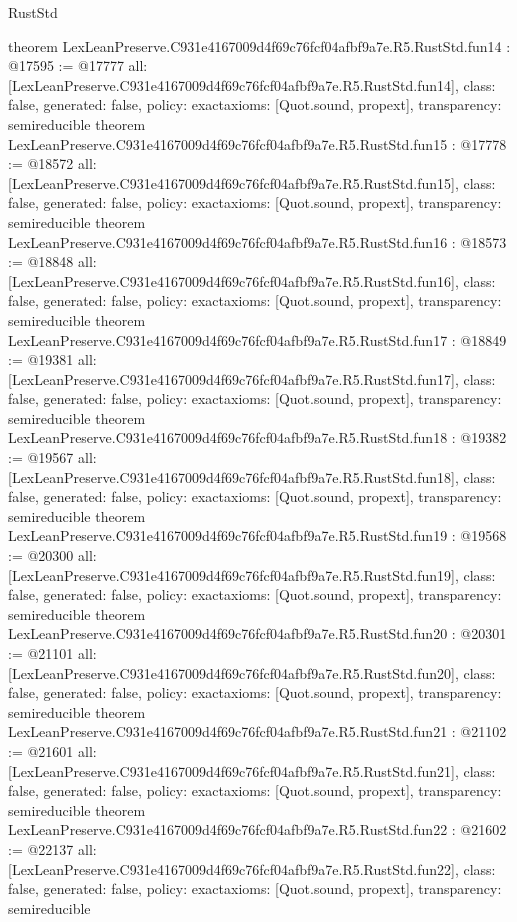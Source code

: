 \begin{lexlean}{RustStd}
\begin{coremodule}
{}
theorem LexLeanPreserve.C931e4167009d4f69c76fcf04afbf9a7e.R5.RustStd.fun14 : @17595 := @17777 {
  all: [LexLeanPreserve.C931e4167009d4f69c76fcf04afbf9a7e.R5.RustStd.fun14],
  class: false,
  generated: false,
  policy: exact{axioms: [Quot.sound, propext]},
  transparency: semireducible
}
theorem LexLeanPreserve.C931e4167009d4f69c76fcf04afbf9a7e.R5.RustStd.fun15 : @17778 := @18572 {
  all: [LexLeanPreserve.C931e4167009d4f69c76fcf04afbf9a7e.R5.RustStd.fun15],
  class: false,
  generated: false,
  policy: exact{axioms: [Quot.sound, propext]},
  transparency: semireducible
}
theorem LexLeanPreserve.C931e4167009d4f69c76fcf04afbf9a7e.R5.RustStd.fun16 : @18573 := @18848 {
  all: [LexLeanPreserve.C931e4167009d4f69c76fcf04afbf9a7e.R5.RustStd.fun16],
  class: false,
  generated: false,
  policy: exact{axioms: [Quot.sound, propext]},
  transparency: semireducible
}
theorem LexLeanPreserve.C931e4167009d4f69c76fcf04afbf9a7e.R5.RustStd.fun17 : @18849 := @19381 {
  all: [LexLeanPreserve.C931e4167009d4f69c76fcf04afbf9a7e.R5.RustStd.fun17],
  class: false,
  generated: false,
  policy: exact{axioms: [Quot.sound, propext]},
  transparency: semireducible
}
theorem LexLeanPreserve.C931e4167009d4f69c76fcf04afbf9a7e.R5.RustStd.fun18 : @19382 := @19567 {
  all: [LexLeanPreserve.C931e4167009d4f69c76fcf04afbf9a7e.R5.RustStd.fun18],
  class: false,
  generated: false,
  policy: exact{axioms: [Quot.sound, propext]},
  transparency: semireducible
}
theorem LexLeanPreserve.C931e4167009d4f69c76fcf04afbf9a7e.R5.RustStd.fun19 : @19568 := @20300 {
  all: [LexLeanPreserve.C931e4167009d4f69c76fcf04afbf9a7e.R5.RustStd.fun19],
  class: false,
  generated: false,
  policy: exact{axioms: [Quot.sound, propext]},
  transparency: semireducible
}
theorem LexLeanPreserve.C931e4167009d4f69c76fcf04afbf9a7e.R5.RustStd.fun20 : @20301 := @21101 {
  all: [LexLeanPreserve.C931e4167009d4f69c76fcf04afbf9a7e.R5.RustStd.fun20],
  class: false,
  generated: false,
  policy: exact{axioms: [Quot.sound, propext]},
  transparency: semireducible
}
theorem LexLeanPreserve.C931e4167009d4f69c76fcf04afbf9a7e.R5.RustStd.fun21 : @21102 := @21601 {
  all: [LexLeanPreserve.C931e4167009d4f69c76fcf04afbf9a7e.R5.RustStd.fun21],
  class: false,
  generated: false,
  policy: exact{axioms: [Quot.sound, propext]},
  transparency: semireducible
}
theorem LexLeanPreserve.C931e4167009d4f69c76fcf04afbf9a7e.R5.RustStd.fun22 : @21602 := @22137 {
  all: [LexLeanPreserve.C931e4167009d4f69c76fcf04afbf9a7e.R5.RustStd.fun22],
  class: false,
  generated: false,
  policy: exact{axioms: [Quot.sound, propext]},
  transparency: semireducible
}
\end{coremodule}
\end{lexlean}
